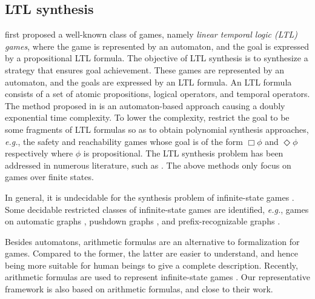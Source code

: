 \documentclass[review]{elsarticle}
\newcommand\eg{{\it e.g.}}
\begin{document}
\subsection{LTL synthesis}
\citet{PnuR1989} first proposed a well-known class of games, namely \textit{linear temporal logic (LTL) games}, where the game is represented by an automaton, and the goal is expressed by a propositional LTL formula.
The objective of LTL synthesis is to synthesize a strategy that ensures goal achievement.
These games	are represented by an automaton, and the goals are expressed by an LTL formula. An LTL formula consists of a set of atomic propositions, logical operators, and temporal operators.
The method proposed in \cite{PnuR1989} is an automaton-based approach causing a doubly exponential time complexity.
To lower the complexity, \citet{AsaMPS1998} restrict the goal to be some fragments of LTL formulas so as to obtain polynomial synthesis approaches, \eg, the safety and reachability games whose goal is of the form $\Box \phi$ and $\Diamond \phi$ respectively where $\phi$ is propositional. The LTL synthesis problem has been addressed in numerous literature, such as \cite{NikAN2015,ZhuTLPV2017,CamMBM2018,GiaFLVX2022,BalFR2023,KreMPR2023}.
The above methods only focus on games over finite states. 

In general, it is undecidable for the synthesis problem of infinite-state games \cite{AlfHM2001}.
Some decidable restricted classes of infinite-state games are identified, \eg, games on automatic graphs \cite{NeiT2016}, pushdown graphs \cite{Cac2002,ChaF2013}, and prefix-recognizable graphs \cite{Cac2003}.

Besides automatons, arithmetic formulas are an alternative to formalization for games.
Compared to the former, the latter are easier to understand, and hence being more suitable for human beings to give a complete description.
Recently, arithmetic formulas are used to represent infinite-state games \cite{BeyCPR2014,FarK2018,BaiCF2021,FaeP2023}.
Our representative framework is also based on arithmetic formulas, and close to their work. 
\end{document}
